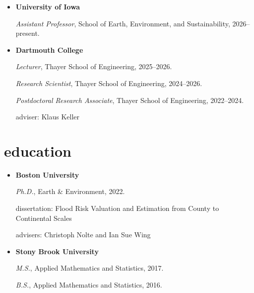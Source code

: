 \documentclass[10pt,oneside]{article}
\begin{document}
\mbox{}\vspace{-\dimexpr\baselineskip\relax}

\begin{itemize}[label={}]
  
  \item \textbf{University of Iowa}
        
        \textit{Assistant Professor}, School of Earth, Environment, and Sustainability, 2026--present.
        
        
        
  \item \textbf{Dartmouth College}
        
        \textit{Lecturer}, Thayer School of Engineering, 2025--2026.
        
        
        \textit{Research Scientist}, Thayer School of Engineering, 2024--2026.
        
        
        \textit{Postdoctoral Research Associate}, Thayer School of Engineering, 2022--2024.
        
        adviser: Klaus Keller
        
        
        
\end{itemize}


\section{education}

\mbox{}\vspace{-\dimexpr\baselineskip\relax}

\begin{itemize}[label={}]
  
  \item \textbf{Boston University}
        
        \textit{Ph.D.}, Earth \& Environment, 2022.
        
        
        dissertation: Flood Risk Valuation and Estimation from County to Continental Scales
        
        advisers: Christoph Nolte and Ian Sue Wing
        
        
  \item \textbf{Stony Brook University}
        
        \textit{M.S.}, Applied Mathematics and Statistics, 2017.
        
        \textit{B.S.}, Applied Mathematics and Statistics, 2016.
        
        
        
\end{itemize}
\end{document}

